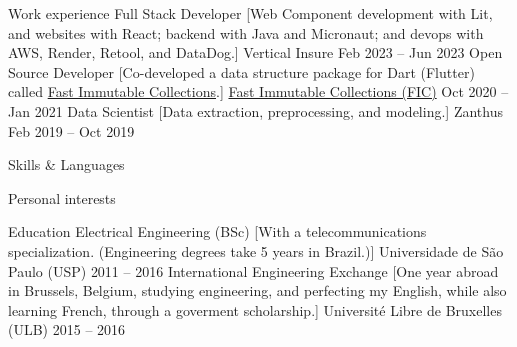 \documentclass{llresume}
\begin{document}
\makeheader

\begin{mainpane}
    \begin{mainsection}{Work experience}
        \entryJob
            {Full Stack Developer}
            [Web Component development with Lit, and websites with React; backend with Java and Micronaut; and devops with AWS, Render, Retool, and DataDog.]
            {Vertical Insure}
            {Feb 2023 -- Jun 2023}
        \entryJob
            {Open Source Developer}
            [Co-developed a data structure package for Dart (Flutter) called \href{https://github.com/marcglasberg/fast_immutable_collections}{Fast Immutable Collections}.]
            {\href{https://github.com/marcglasberg/fast_immutable_collections}{Fast Immutable Collections (FIC)}}
            {Oct 2020 -- Jan 2021}
        \entryJob
            {Data Scientist}
            [Data extraction, preprocessing, and modeling.]
            {Zanthus}
            {Feb 2019 -- Oct 2019}
    \end{mainsection}
    
    \begin{mainsection}{Skills \& Languages}
    \end{mainsection}
    
    \begin{mainsection}{Personal interests}
    \end{mainsection}
    
    \begin{mainsection}{Education}
        \entryJob
            {Electrical Engineering (BSc)}
            [With a telecommunications specialization. (Engineering degrees take 5 years in Brazil.)]
            {Universidade de São Paulo (USP)}
            {2011 -- 2016}
        \entryJob
            {International Engineering Exchange}
            [One year abroad in Brussels, Belgium, studying engineering, and perfecting my English, while also learning French, through a goverment scholarship.]
            {Université Libre de Bruxelles (ULB)}
            {2015 -- 2016}
    \end{mainsection}
    

\end{mainpane}
\end{document}
